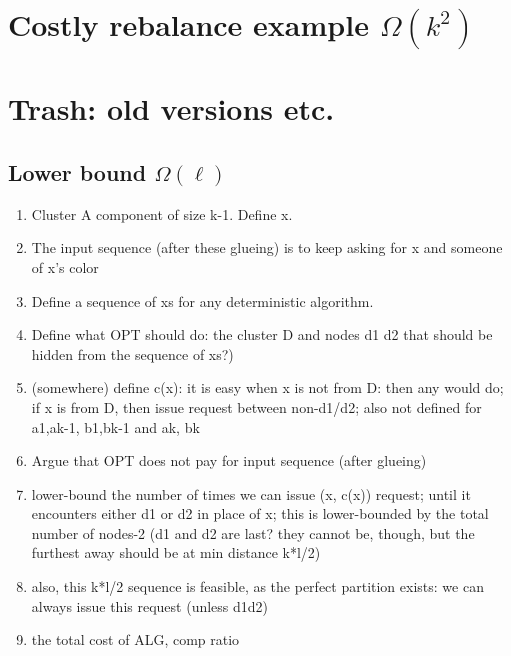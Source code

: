 \section{Costly rebalance example $\Omega(k^2)$}


\section{Trash: old versions etc.}


\subsection{Lower bound $\Omega(\ell)$}

  \begin{enumerate}
    \item Cluster A component of size k-1. Define x.
    \item The input sequence (after these glueing) is to keep asking for x and someone of x's color
    \item Define a sequence of xs for any deterministic algorithm.
    \item Define what OPT should do: the cluster D and nodes d1 d2 that should be hidden from the sequence of xs?)
    \item (somewhere) define c(x): it is easy when x is not from D: then any would do; if x is from D, then issue request between non-d1/d2; also not defined for a1,ak-1, b1,bk-1 and ak, bk
    \item Argue that OPT does not pay for input sequence (after glueing)
    \item lower-bound the number of times we can issue (x, c(x)) request; until it encounters either d1 or d2 in place of x; this is lower-bounded by the total number of nodes-2 (d1 and d2 are last? they cannot be, though, but the furthest away should be at min distance k*l/2)
    \item also, this k*l/2 sequence is feasible, as the perfect partition exists: we can always issue this request (unless d1d2)
    \item the total cost of ALG, comp ratio
  \end{enumerate}




